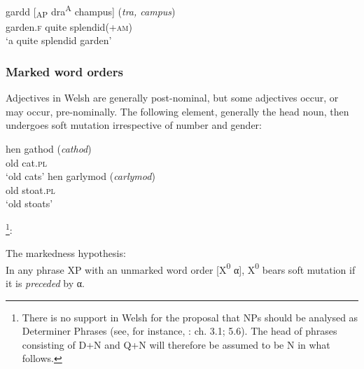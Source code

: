 \documentclass[output=paper,colorlinks,citecolor=brown]{langscibook}
\begin{document}
\ea\label{ex:mt:tallerman:7}
\gll gardd [\textsubscript{AP} dra\textsuperscript{A} champus] (\textit{tra, campus})\\
garden.\textsc{f} {} quite splendid(+\textsc{am})\\
\glt ‘a quite splendid garden’ 
\z


\subsubsection{Marked word orders}

Adjectives in Welsh are generally post-nominal, but some adjectives occur, or may occur, pre-nominally. The following element, generally the head noun, then undergoes soft mutation irrespective of number and gender:

\ea\label{ex:mt:tallerman8}
\ea\label{ex:mt:tallerman8:a}
\gll hen gathod    (\textit{cathod})\\
old cat.\textsc{pl}\\
\glt ‘old cats’
\ex\label{ex:mt:tallerman8:b}
\gll hen garlymod  (\textit{carlymod})\\
old stoat.\textsc{pl}\\
\glt ‘old stoats’
\z
\z

\footnote{{There is no support in Welsh for the proposal that NPs should be analysed as Determiner Phrases (see, for instance, \citet{BorsleyEtAl2007}: ch. 3.1; 5.6). The head of phrases consisting of D+N and Q+N will therefore be assumed to be N in what follows.}}{:} 

\ea\label{ex:mt:tallerman9}
The markedness hypothesis:\\
In any phrase XP with an unmarked word order [X{\textsuperscript{0}}{ α], X}{\textsuperscript{0}}{ bears soft mutation if it is} {\textit{preceded} }{by α.}\\
\z
\end{document}
